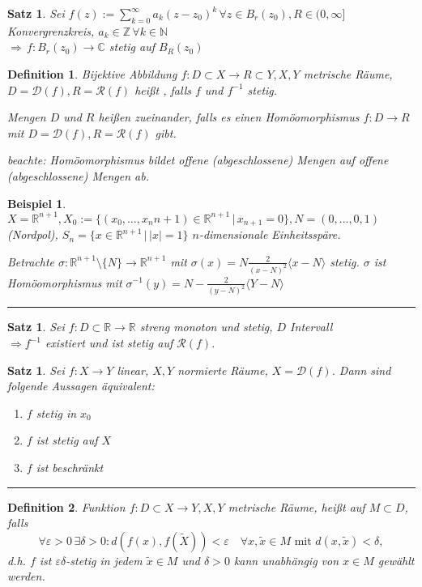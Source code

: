 \documentclass[ngerman,a4paper]{report}
\theoremstyle{break}
\newtheorem{example}[theorem]{Beispiel}
\newtheorem{satz}[theorem]{Satz}
\newtheorem*{definition}{Definition}
\newcommand{\highlight}[1]{\emph{#1}}
\renewcommand{\epsilon}{\varepsilon}
\begin{document}
\begin{satz}
	Sei $f(z) := \sum_{k=0}^\infty a_k(z-z_0)^k\,\forall z\in B_r(z_0), R\in(0,\infty]$ Konvergrenzkreis, $a_k\in\mathbb{Z}\, \forall k\in \mathbb{N}$\\
	$\Rightarrow\, f:B_r(z_0) \to \mathbb{C}$ stetig auf $B_R(z_0)$
\end{satz}
\addtocounter{theorem}{2}
\begin{definition}
	Bijektive Abbildung $f:D\subset X\to R\subset Y, X,Y$ metrische Räume, $D=\mathcal{D}(f), R=\mathcal{R}(f)$ heißt , falls $f$ und $f^{-1}$ stetig.
	
	Mengen $D$ und $R$ heißen  zueinander, falls es einen Homöomorphismus $f:D\to R$ mit $D=\mathcal{D}(f), R=\mathcal{R}(f)$ gibt.
	
	\highlight{beachte:} Homöomorphismus bildet offene (abgeschlossene) Mengen auf offene (abgeschlossene) Mengen ab.
\end{definition}
\begin{example}
	
	$X=\mathbb{R}^{n+1}, X_0 := \{(x_0, \dotsc, x_n{n+1}) \in\mathbb{R}^{n+1} \,|\, x_{n+1}=0\}, N = (0,\dotsc, 0,1)$ (Nordpol), $S_n = \{ x\in\mathbb{R}^{n+1} \,|\, |x|=1\}$ $n$-dimensionale Einheitsspäre.
	
	Betrachte $\sigma: \mathbb{R}^{n+1} \setminus\{ N\} \rightarrow \mathbb{R}^{n+1}$ mit $\sigma(x) = N \frac{2}{(x-N)^2}\langle x-N\rangle$ stetig. $\sigma$ ist Homöomorphismus mit $\sigma^{-1}(y) = N - \frac{2}{(y-N)^2}\langle Y-N\rangle$
\end{example}
\rule{4cm}{0.4pt}
\begin{satz}
	Sei $f:D\subset \mathbb{R}\to \mathbb{R}$ streng monoton und stetig, $D$ Intervall \\
	$\Rightarrow f^{-1}$ existiert und ist stetig auf $\mathcal{R}(f)$.
\end{satz}
\begin{satz}
	Sei $f:X\to Y$ linear, $X,Y$ normierte Räume, $X=\mathcal{D}(f)$. Dann sind folgende Aussagen äquivalent:
	\begin{enumerate}[label={\arabic*)}]
		\item $f$ stetig in $x_0$
		\item $f$ ist stetig auf $X$
		\item $f$ ist beschränkt
	\end{enumerate}
\end{satz}
\rule{4cm}{0.4pt}
\begin{definition}
	Funktion $f:D\subset X\to Y, X,Y$ metrische Räume, heißt  auf $M\subset D$, falls \[ \forall \epsilon > 0 \,\exists \delta > 0: d(f(x), f(\tilde{X})) < \epsilon\quad \forall x,\tilde{x}\in M \text{ mit $d(x,\tilde{x}) < \delta$}, \]
	d.h. $f$ ist $\epsilon\delta$-stetig in jedem $\tilde{x}\in M$ \highlight{und} $\delta > 0$ kann unabhängig von $x\in M$ gewählt werden.
\end{definition}
\end{document}
